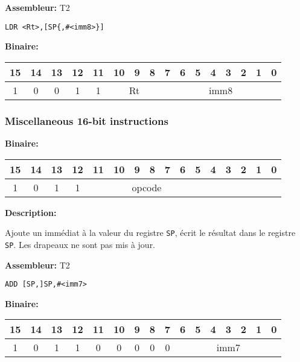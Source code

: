 \textbf{Assembleur:} T2

\begin{lstlisting}
LDR <Rt>,[SP{,#<imm8>}]
\end{lstlisting}

\textbf{Binaire:}\\

\begin{tabular}{| c c c c c c c c c c c c c c c c |}
\hline
15 & 14 & 13 & 12 & \multicolumn{1}{|c}{11} & \multicolumn{1}{|c}{10} & 9 & 8 & \multicolumn{1}{|c}{7} & 6 & 5 & 4 & 3 & 2 & 1 & 0 \\
\hline
1 & 0 & 0 & 1 & \multicolumn{1}{|c}{1} & \multicolumn{3}{|c}{Rt} & \multicolumn{8}{|c|}{imm8} \\
\hline
\end{tabular}



\subsubsection{Miscellaneous 16-bit instructions}

\textbf{Binaire:}\\

\begin{tabular}{| c c c c c c c c c c c c c c c c |}
\hline
15 & 14 & 13 & 12 & \multicolumn{1}{|c}{11} & 10 & 9 & 8 & 7 & 6 & 5 & \multicolumn{1}{|c}{4} & 3 & 2 & 1 & 0 \\
\hline
1 & 0 & 1 & 1 & \multicolumn{7}{|c}{opcode} & \multicolumn{5}{|c|}{} \\
\hline
\end{tabular}


\textbf{Description: }

Ajoute un immédiat à la valeur du registre \texttt{SP}, écrit le résultat dans le registre \texttt{SP}.
Les drapeaux ne sont pas mis à jour.

\textbf{Assembleur:} T2

\begin{lstlisting}
ADD [SP,]SP,#<imm7>
\end{lstlisting}

\textbf{Binaire:}\\

\begin{tabular}{| c c c c c c c c c c c c c c c c |}
\hline
15 & 14 & 13 & 12 & \multicolumn{1}{|c}{11} & 10 & 9 & 8 & \multicolumn{1}{|c}{7} & \multicolumn{1}{|c}{6} & 5 & 4 & 3 & 2 & 1 & 0 \\
\hline
1 & 0 & 1 & 1 & \multicolumn{1}{|c}{0} & 0 & 0 & 0 & \multicolumn{1}{|c}{0} & \multicolumn{7}{|c|}{imm7} \\
\hline
\end{tabular}

